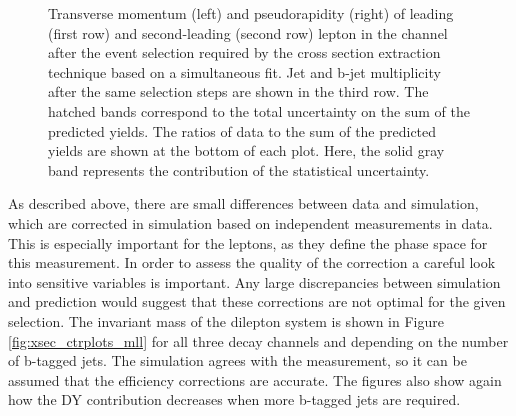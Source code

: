 \begin{figure}[htbp!]
\begin{center}
      \caption{Transverse momentum (left) and pseudorapidity (right)
        of leading (first row) and second-leading (second row) lepton in the \ee channel after the
        event selection required by the \ttbar cross section
        extraction technique based on a simultaneous fit. Jet and b-jet multiplicity after the same selection steps are
        shown in the third row. The hatched
        bands correspond to the total uncertainty on the sum of the
        predicted yields. 
        The ratios of data to the sum of the predicted yields are
        shown at the bottom of each plot. Here, the solid gray band
        represents the contribution of the statistical uncertainty.}  
       \label{fig:xsec_ee_ctrplots}
  \end{center}
\end{figure}

As described above, there are small differences between data and simulation, which are corrected in simulation based on independent measurements in data.
This is especially important for the leptons, as they define the phase space for this measurement.
In order to assess the quality of the correction a careful look into sensitive variables is important. Any large discrepancies between simulation and prediction would suggest that these corrections
are not optimal for the given selection.
The invariant mass of the dilepton system is shown in Figure \ref{fig:xsec_ctrplots_mll} for all three decay channels and depending on the number of b-tagged jets.
The simulation agrees with the measurement, so it can be assumed that the efficiency corrections are accurate.
The figures also show again how the DY contribution decreases when more b-tagged jets are required.


